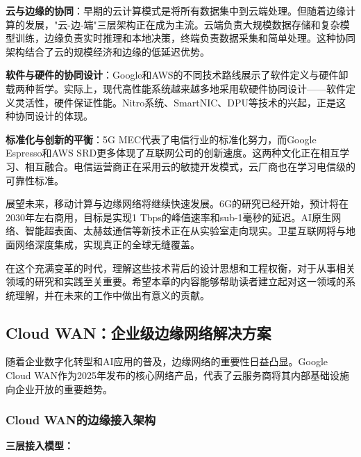 \textbf{云与边缘的协同}：早期的云计算模式是将所有数据集中到云端处理。但随着边缘计算的发展，"云-边-端"三层架构正在成为主流。云端负责大规模数据存储和复杂模型训练，边缘负责实时推理和本地决策，终端负责数据采集和简单处理。这种协同架构结合了云的规模经济和边缘的低延迟优势。

\textbf{软件与硬件的协同设计}：Google和AWS的不同技术路线展示了软件定义与硬件卸载两种哲学。实际上，现代高性能系统越来越多地采用软硬件协同设计——软件定义灵活性，硬件保证性能。Nitro系统、SmartNIC、DPU等技术的兴起，正是这种协同设计的体现。

\textbf{标准化与创新的平衡}：5G MEC代表了电信行业的标准化努力，而Google Espresso和AWS SRD更多体现了互联网公司的创新速度。这两种文化正在相互学习、相互融合。电信运营商正在采用云的敏捷开发模式，云厂商也在学习电信级的可靠性标准。

展望未来，移动计算与边缘网络将继续快速发展。6G的研究已经开始，预计将在2030年左右商用，目标是实现1 Tbps的峰值速率和sub-1毫秒的延迟。AI原生网络、智能超表面、太赫兹通信等新技术正在从实验室走向现实。卫星互联网将与地面网络深度集成，实现真正的全球无缝覆盖。

在这个充满变革的时代，理解这些技术背后的设计思想和工程权衡，对于从事相关领域的研究和实践至关重要。希望本章的内容能够帮助读者建立起对这一领域的系统理解，并在未来的工作中做出有意义的贡献。

\newpage


\subsection{Cloud WAN：企业级边缘网络解决方案}

随着企业数字化转型和AI应用的普及，边缘网络的重要性日益凸显。Google Cloud WAN作为2025年发布的核心网络产品，代表了云服务商将其内部基础设施向企业开放的重要趋势。

\subsubsection{Cloud WAN的边缘接入架构}

\textbf{三层接入模型：}

